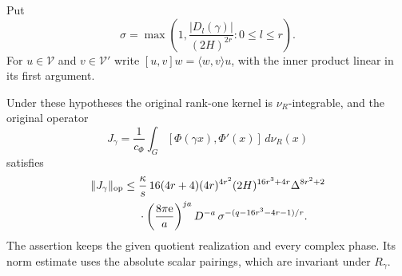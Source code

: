 Put
\[
 \sigma=\max\left(1,\frac{|D_l(\gamma)|}{(2H)^{2r}}:
                                               0\le l\le r\right).
\]
For $u\in\mathcal V$ and $v\in\mathcal V'$ write
$[u,v]w=\langle w,v\rangle u$, with the inner product linear
in its first argument.

\begin{theorem}
\label{thm:actual-local-degenerate-bound}
Under these hypotheses the original rank-one kernel is
$\nu_R$-integrable, and the original operator
\[
             J_\gamma=\frac1{c_\Phi}
                \int_G[\Phi(\gamma x),\Phi'(x)]\,d\nu_R(x)
\]
satisfies
\begin{align}
 \|J_\gamma\|_{\rm op}\le{}&
 \frac{\kappa}{s}\,
 16(4r+4)(4r)^{4r^2}(2H)^{16r^3+4r}
                       \Delta^{8r^2+2}\notag\\
    &{}\cdot\left(\frac{8\pi\mathrm e}{a}\right)^{ja}
    D^{-a}\,
    \sigma^{-(q-16r^3-4r-1)/r}.
 \label{eq:actual-local-degenerate-bound}
\end{align}
The assertion keeps the given quotient realization and every
complex phase.  Its norm estimate uses the absolute scalar
pairings, which are invariant under $R_\gamma$.
\end{theorem}

